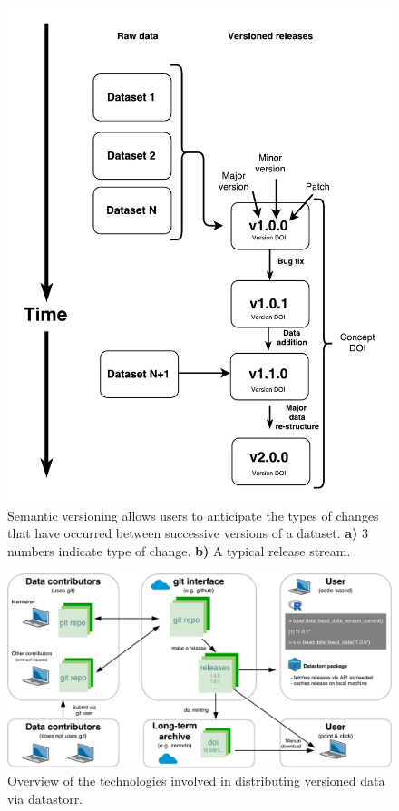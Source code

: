 \documentclass[a4paper,11pt]{article}
\begin{document}
\begin{figure}[!hb]
\centering
\includegraphics[width=\linewidth]{figures/Figure1.pdf}
\caption{Semantic versioning allows users to anticipate the types of changes that have occurred between successive versions of a dataset.
\textbf{a)} 3 numbers indicate type of change.
\textbf{b)} A typical release stream.}
\label{fig:semantic}
\end{figure}

\newpage


\begin{figure}[!hb]
\centering
\includegraphics[width=\linewidth]{figures/Figure2.pdf}
\caption{Overview of the technologies involved in distributing versioned data via datastorr.}
\label{fig:technology_stack}
\end{figure}

\end{document}
